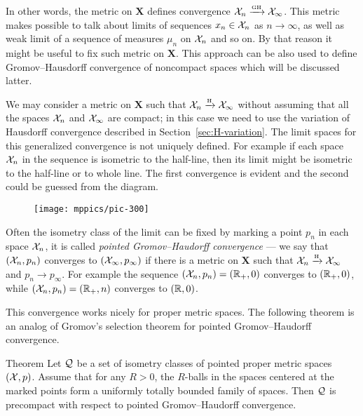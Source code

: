 In other words, the metric on $\bm{X}$ defines convergence $\mathcal{X}_n\xrightarrow{\mbox{\tiny\rm GH}} \mathcal{X}_\infty$.
This metric makes possible to talk about limits of sequences $x_n\in \mathcal{X}_n$ as $n\to\infty$, as well as weak limit of a sequence of measures $\mu_n$ on $\mathcal{X}_n$ and so on.
By that reason it might be useful to fix such metric on $\bm{X}$.
This approach can be also used to define Gromov--Hausdorff convergence of noncompact spaces which will be discussed latter.

We may consider a metric on $\bm{X}$ such that $\mathcal{X}_n\xrightarrow{\mbox{\tiny\rm H}} \mathcal{X}_\infty$ without assuming that all the spaces $\mathcal{X}_n$ and $\mathcal{X}_\infty$ are compact; in this case we need to use the variation of Hausdorff convergence described in Section~\ref{sec:H-variation}.
The limit spaces for this generalized convergence is not uniquely defined.
For example if each space $\mathcal{X}_n$ in the sequence is isometric to the half-line, then its limit might be isometric to the half-line or to whole line.
The first convergence is evident and the second could be guessed from the diagram.

\begin{figure}[h!]
\vskip-0mm
\centering
\texttt{[image: mppics/pic-300]}
\end{figure}

Often the isometry class of the limit can be fixed by marking a point $p_n$ in each space $\mathcal{X}_n$, it is called \emph{pointed Gromov--Haudorff convergence} --- we say that $(\mathcal{X}_n,p_n)$ converges to $(\mathcal{X}_\infty,p_\infty)$ if there is a metric on $\bm{X}$ such that $\mathcal{X}_n\xrightarrow{\mbox{\tiny\rm H}} \mathcal{X}_\infty$ and $p_n\to p_\infty$.
For example the sequence $(\mathcal{X}_n,p_n)=(\mathbb{R}_+,0)$ converges to $(\mathbb{R}_+,0)$, while $(\mathcal{X}_n,p_n)=(\mathbb{R}_+,n)$ converges to $(\mathbb{R},0)$.

This convergence works nicely for proper metric spaces.
The following theorem is an analog of Gromov's selection theorem for pointed Gromov--Haudorff convergence.

\begin{thm}{Theorem}\label{thm:pointed-gromov-compactness}%
Let $\mathcal{Q}$ be a set of isometry classes of pointed proper metric spaces
$(\mathcal{X},p)$.
Assume that for any $R>0$, the $R$-balls in the spaces centered at the marked points form a uniformly totally bounded family of spaces.
Then $\mathcal{Q}$ is precompact with respect to pointed Gromov--Haudorff convergence. 
\end{thm}
